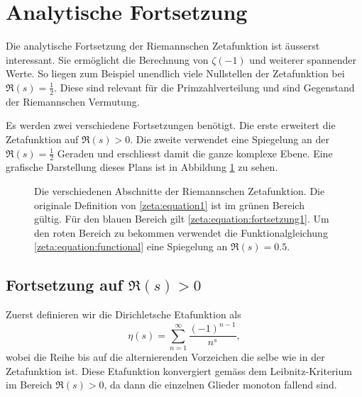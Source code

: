 \section{Analytische Fortsetzung} \label{zeta:section:analytische_fortsetzung}

Die analytische Fortsetzung der Riemannschen Zetafunktion ist äusserst interessant.
Sie ermöglicht die Berechnung von $\zeta(-1)$ und weiterer spannender Werte.
So liegen zum Beispiel unendlich viele Nullstellen der Zetafunktion bei $\Re(s) = \frac{1}{2}$.
Diese sind relevant für die Primzahlverteilung und sind Gegenstand der Riemannschen Vermutung.

Es werden zwei verschiedene Fortsetzungen benötigt.
Die erste erweitert die Zetafunktion auf $\Re(s) > 0$.
Die zweite verwendet eine Spiegelung an der $\Re(s) = \frac{1}{2}$ Geraden und erschliesst damit die ganze komplexe Ebene.
Eine grafische Darstellung dieses Plans ist in Abbildung \ref{zeta:fig:continuation_overview} zu sehen.
\begin{figure}
    \centering
    
    \caption{
        Die verschiedenen Abschnitte der Riemannschen Zetafunktion.
        Die originale Definition von \eqref{zeta:equation1} ist im grünen Bereich gültig.
        Für den blauen Bereich gilt \eqref{zeta:equation:fortsetzung1}.
        Um den roten Bereich zu bekommen verwendet die Funktionalgleichung \eqref{zeta:equation:functional} eine Spiegelung an $\Re(s) = 0.5$.
    }
    \label{zeta:fig:continuation_overview}
\end{figure}

\subsection{Fortsetzung auf $\Re(s) > 0$} \label{zeta:subsection:auf_bereich_ge_0}
Zuerst definieren wir die Dirichletsche Etafunktion als
\begin{equation}\label{zeta:equation:eta}
    \eta(s)
    =
    \sum_{n=1}^{\infty}
    \frac{(-1)^{n-1}}{n^s},
\end{equation}
wobei die Reihe bis auf die alternierenden Vorzeichen die selbe wie in der Zetafunktion ist.
Diese Etafunktion konvergiert gemäss dem Leibnitz-Kriterium im Bereich $\Re(s) > 0$, da dann die einzelnen Glieder monoton fallend sind.

